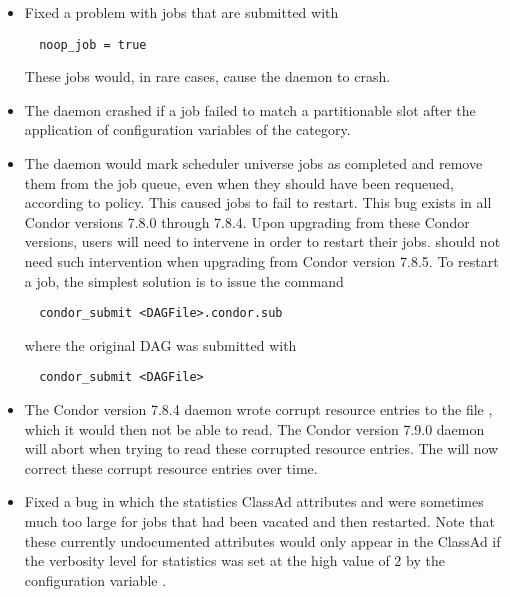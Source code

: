 \begin{itemize}

\item Fixed a problem with jobs that are submitted with
\begin{verbatim}
  noop_job = true
\end{verbatim}
These jobs would, in rare cases, cause the  daemon to crash.  

\item The  daemon crashed if a job failed to match 
a partitionable slot after the application 
of configuration variables of the  category.

\item The  daemon would mark scheduler universe jobs
as completed and remove them from the job queue,
even when they should have been requeued, according to policy.
This caused  jobs to fail to restart. This bug exists
in all Condor versions 7.8.0 through 7.8.4.
Upon upgrading from these Condor versions, users will need to intervene
in order to restart their  jobs.  should not
need such intervention when upgrading from Condor version 7.8.5.  
To restart a  job, 
the simplest solution is to issue the command
\begin{verbatim}
  condor_submit <DAGFile>.condor.sub
\end{verbatim}
where the original DAG was submitted with 
\begin{verbatim}
  condor_submit <DAGFile>
\end{verbatim}

\item The Condor version 7.8.4  daemon wrote 
corrupt resource entries to the file ,
which it would then not be able to read.
The Condor version 7.9.0  daemon will abort 
when trying to read these corrupted resource entries. 
The  will now correct these corrupt
resource entries over time.

\item Fixed a bug in which the  statistics ClassAd attributes
and  were sometimes much too large for jobs
that had been vacated and then restarted.
Note that these currently undocumented attributes would only appear
in the ClassAd if the verbosity level for  statistics
was set at the high value of 2 by the configuration variable
.

\end{itemize}

